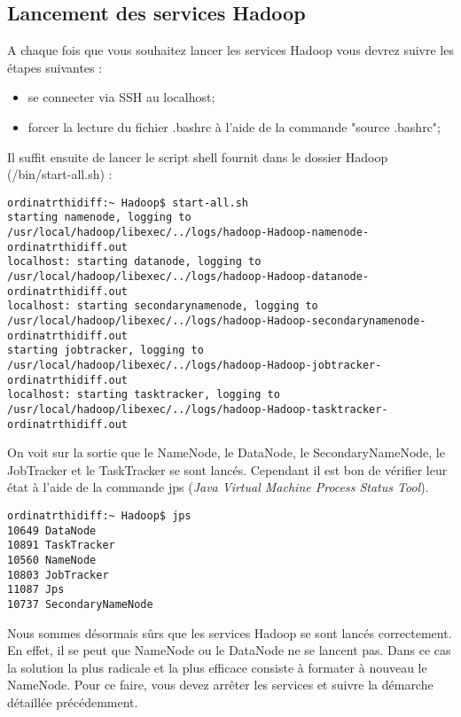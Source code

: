 \subsection{Lancement des services Hadoop}

\par A chaque fois que vous souhaitez lancer les services Hadoop vous devrez suivre les étapes suivantes :

\begin{itemize}
\item se connecter via SSH au localhost;
\item forcer la lecture du fichier .bashrc à l'aide de la commande "source .bashrc";
\end{itemize}

\par Il suffit ensuite de lancer le script shell fournit dans le dossier Hadoop (/bin/start-all.sh) :

\begin{verbatim}
ordinatrthidiff:~ Hadoop$ start-all.sh
starting namenode, logging to /usr/local/hadoop/libexec/../logs/hadoop-Hadoop-namenode-ordinatrthidiff.out
localhost: starting datanode, logging to /usr/local/hadoop/libexec/../logs/hadoop-Hadoop-datanode-ordinatrthidiff.out
localhost: starting secondarynamenode, logging to /usr/local/hadoop/libexec/../logs/hadoop-Hadoop-secondarynamenode-ordinatrthidiff.out
starting jobtracker, logging to /usr/local/hadoop/libexec/../logs/hadoop-Hadoop-jobtracker-ordinatrthidiff.out
localhost: starting tasktracker, logging to /usr/local/hadoop/libexec/../logs/hadoop-Hadoop-tasktracker-ordinatrthidiff.out
\end{verbatim}

\par On voit sur la sortie que le NameNode, le DataNode, le SecondaryNameNode, le JobTracker et le TaskTracker se sont lancés. Cependant il est bon de vérifier leur état à l'aide de la commande jps (\textit{Java Virtual Machine Process Status Tool}).

\begin{verbatim}
ordinatrthidiff:~ Hadoop$ jps
10649 DataNode
10891 TaskTracker
10560 NameNode
10803 JobTracker
11087 Jps
10737 SecondaryNameNode
\end{verbatim}

\par Nous sommes désormais sûrs que les services Hadoop se sont lancés correctement. En effet, il se peut que NameNode ou le DataNode ne se lancent pas. Dans ce cas la solution la plus radicale et la plus efficace consiste à formater à nouveau le NameNode. Pour ce faire, vous devez arrêter les services et suivre la démarche détaillée précédemment.

